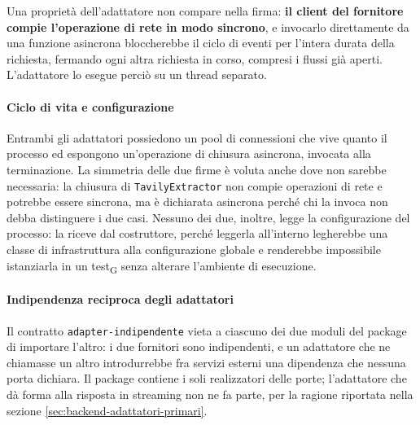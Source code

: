 \documentclass[a4paper, 10pt]{article}
\begin{document}
Una proprietà dell'adattatore non compare nella firma: \textbf{il client del fornitore compie l'operazione di rete in modo sincrono}, e invocarlo direttamente da una funzione asincrona bloccherebbe il ciclo di eventi per l'intera durata della richiesta, fermando ogni altra richiesta in corso, compresi i flussi già aperti. L'adattatore lo esegue perciò su un thread separato.

\paragraph{Ciclo di vita e configurazione}
Entrambi gli adattatori possiedono un pool di connessioni che vive quanto il processo ed espongono un'operazione di chiusura asincrona, invocata alla terminazione. La simmetria delle due firme è voluta anche dove non sarebbe necessaria: la chiusura di \texttt{TavilyExtractor} non compie operazioni di rete e potrebbe essere sincrona, ma è dichiarata asincrona perché chi la invoca non debba distinguere i due casi. Nessuno dei due, inoltre, legge la configurazione del processo: la riceve dal costruttore, perché leggerla all'interno legherebbe una classe di infrastruttura alla configurazione globale e renderebbe impossibile istanziarla in un test\textsubscript{G} senza alterare l'ambiente di esecuzione.

\paragraph{Indipendenza reciproca degli adattatori}
Il contratto \texttt{adapter-indipendente} vieta a ciascuno dei due moduli del package di importare l'altro: i due fornitori sono indipendenti, e un adattatore che ne chiamasse un altro introdurrebbe fra servizi esterni una dipendenza che nessuna porta dichiara. Il package contiene i soli realizzatori delle porte; l'adattatore che dà forma alla risposta in streaming non ne fa parte, per la ragione riportata nella sezione \ref{sec:backend-adattatori-primari}.
\end{document}
